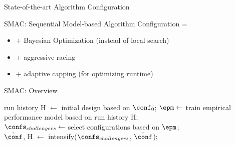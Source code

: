 \begin{frame}[c]{State-of-the-art Algorithm Configuration}

SMAC: Sequential Model-based Algorithm Configuration =

\begin{itemize}
	\item + Bayesian Optimization (instead of local search)
	\item + aggressive racing
	\item + adaptive capping (for optimizing runtime)
\end{itemize}

\end{frame}
\begin{frame}[c]{SMAC: Overview}

\LinesNotNumbered
\begin{algorithm}[H]
	\BlankLine
	run history H $\leftarrow$ initial design based on $\conf_0$; 
	 {
		\pause
		$\epm \leftarrow$ train empirical performance model based on run history H;\\
		\pause
		$\confs_{challengers} \leftarrow$ select configurations based on $\epm$;\\
		\pause
		$\hat{\conf}$, H $\leftarrow$ intensify($\confs_{challengers}$, $\hat{\conf}$); 
	}
	\pause
	\Return{$\hat{\conf}$}
	\caption{SMAC}
\end{algorithm}

\end{frame}

